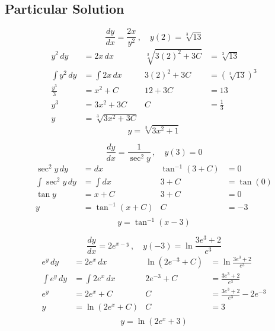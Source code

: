 \documentclass[12pt]{article}
\begin{document}
\subsection*{Particular Solution}
\vspace*{-24pt}
\begin{multicols}{2}
    \begin{center}
    $$\frac{dy}{dx} = \frac{2x}{y^2}\,, \quad y(2) = \sqrt[3]{13}$$
    \vspace*{-24pt}
    \begin{align*}
        y^2\,dy &= 2x\,dx & \sqrt[3]{3(2)^2 + 3C} &= \sqrt[3]{13} \\
        \int y^2\,dy &= \int 2x\,dx & 3(2)^2 + 3C &= \left(\sqrt[3]{13}\right)^3\\
        \frac{y^3}{3} &= x^2 + C & 12 + 3C &= 13 \\
        y^3 &= 3x^2 + 3C & C &= \frac{1}{3}\\
        y &= \sqrt[3]{3x^2 + 3C} 
    \end{align*}
    \vspace*{-24pt}
    $$y = \sqrt[3]{3x^2 + 1}$$ 

    $$\frac{dy}{dx} = \frac{1}{\sec^2\! y}\,, \quad y(3)  = 0$$
    \vspace*{-24pt}
    \begin{align*}
        \sec^2\! y\,dy &= dx & \tan^{-1}(3 + C) &= 0\\
        \int \sec^2\!y\,dy &= \int dx & 3+C &= \tan(0)\\
        \tan y &= x + C & 3 + C &= 0 \\
        y &= \tan^{-1}(x + C) & C &= -3 \\
    \end{align*}
    \vspace*{-32pt}
    $$y = \tan^{-1}(x - 3)$$ 
    \vspace{64pt} 

\columnbreak
    
    $$\frac{dy}{dx} = 2e^{x - y}\,, \quad y(-3) = \ln \frac{3e^3 + 2}{e^3}$$
    \vspace*{-24pt}
    \begin{align*}
        e^y\,dy &= 2e^x\,dx & \ln(2e^{-3}+C) &= \ln \frac{3e^3 + 2}{e^3} \\
        \int e^y\,dy &= \int 2e^x\,dx & 2e^{-3}+C &= \frac{3e^3 + 2}{e^3}\\
        e^y &= 2e^x + C & C &= \frac{3e^3 + 2}{e^3} - 2e^{-3} \\
        y &= \ln(2e^x+C) & C &= 3\\
    \end{align*}
    \vspace*{-32pt}
    $$y = \ln(2e^x+3)$$ 
    

\end{center}
\end{multicols}
\end{document}
